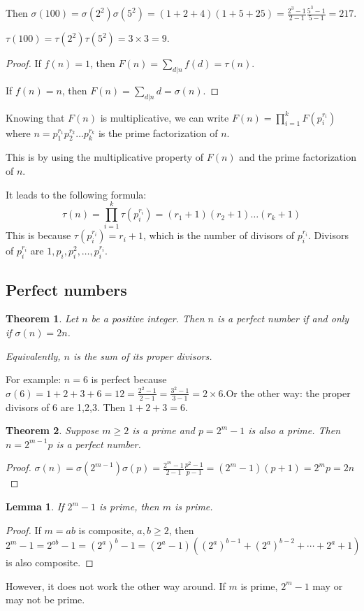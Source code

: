 \documentclass[letterpaper,12pt,oneside]{article}
\newtheorem{theorem}{Theorem}
\newtheorem*{lemma}{Lemma}
\begin{document}
Then $\sigma(100)=\sigma(2^2)\sigma(5^2)=(1+2+4)(1+5+25)=\frac{2^3-1}{2-1}\frac{5^3-1}{5-1}=217$.

$\tau(100)=\tau(2^2)\tau(5^2)=3\times 3=9$.
\begin{proof}
    If $f(n)=1$, then $F(n)=\sum_{d|n}f(d)=\tau(n)$.

    If $f(n)=n$, then $F(n)=\sum_{d|n}d=\sigma(n)$.
\end{proof}
Knowing that $F(n)$ is multiplicative, we can write $F(n)=\prod_{i=1}^k F(p_i^{r_i})$ where $n=p_1^{r_1}p_2^{r_2}\ldots p_k^{r_k}$ is the prime factorization of $n$.

This is by using the multiplicative property of $F(n)$ and the prime factorization of $n$.

It leads to the following formula:\[
    \tau(n)=\prod_{i=1}^k \tau(p_i^{r_i})=(r_1+1)(r_2+1)\ldots (r_k+1)
\]
This is because $\tau(p_i^{r_i})=r_i+1$, which is the number of divisors of $p_i^{r_i}$. Divisors of $p_i^{r_i}$ are $1,p_i,p_i^2,\ldots,p_i^{r_i}$.
\subsection{Perfect numbers}
\begin{theorem}
    Let $n$ be a positive integer. Then $n$ is a perfect number if and only if $\sigma(n)=2n$.

    Equivalently, $n$ is the sum of its proper divisors.
\end{theorem}
For example: $n=6$ is perfect because $\sigma(6)=1+2+3+6=12=\frac{2^2-1}{2-1}=\frac{3^2-1}{3-1}=2\times 6$.Or the other way: the proper divisors of 6 are 1,2,3. Then $1+2+3=6$.
\begin{theorem}
    Suppose $m\ge 2$ is a prime and $p=2^m-1$ is also a prime. Then $n=2^{m-1}p$ is a perfect number.
\end{theorem}
\begin{proof}
    $\sigma(n)=\sigma(2^{m-1})\sigma(p)=\frac{2^m-1}{2-1}\frac{p^2-1}{p-1}=(2^m-1)(p+1)=2^m p=2n$
\end{proof}
\begin{lemma}
    If $2^m-1$ is prime, then $m$ is prime.
\end{lemma}
\begin{proof}
    If $m=ab$ is composite, $a,b\ge 2$, then $2^m-1=2^{ab}-1=(2^a)^b -1 =(2^a-1)((2^a)^{b-1}+(2^a)^{b-2}+\cdots+2^a+1)$ is also composite.
\end{proof}
However, it does not work the other way around. If $m$ is prime, $2^m-1$ may or may not be prime.
\end{document}
